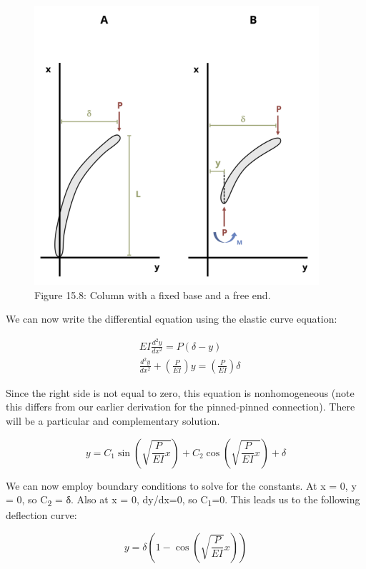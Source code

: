 \documentclass[
  letterpaper,
  DIV=11,
  numbers=noendperiod]{scrreprt}
\theoremstyle{definition}
\theoremstyle{remark}
\begin{document}
\begin{figure}[H]

{\centering \includegraphics[width=4.14583in,height=\textheight]{images/CH15s PNGs/figure 15.8.png}

}

\caption{Figure 15.8: Column with a fixed base and a free end.}

\end{figure}%

We can now write the differential equation using the elastic curve
equation:

\[
\begin{aligned}
& E I \frac{d^2 y}{d x^2}=P(\delta-y) \\
& \frac{d^2 y}{d x^2}+\left(\frac{P}{E I}\right) y=\left(\frac{P}{E I}\right) \delta
\end{aligned}
\]

Since the right side is not equal to zero, this equation is
nonhomogeneous (note this differs from our earlier derivation for the
pinned-pinned connection). There will be a particular and complementary
solution.

\[
y=C_1 \sin \left(\sqrt{\frac{P}{E I} x}\right)+C_2 \cos \left(\sqrt{\frac{P}{E I} x}\right)+\delta
\]

We can now employ boundary conditions to solve for the constants. At x =
0, y = 0, so C\textsubscript{2} = δ. Also at x = 0, dy/dx=0, so
C\textsubscript{1}=0. This leads us to the following deflection curve:

\[
y=\delta\left(1-\cos \left(\sqrt{\frac{P}{E I}} x\right)\right)
\]
\end{document}
